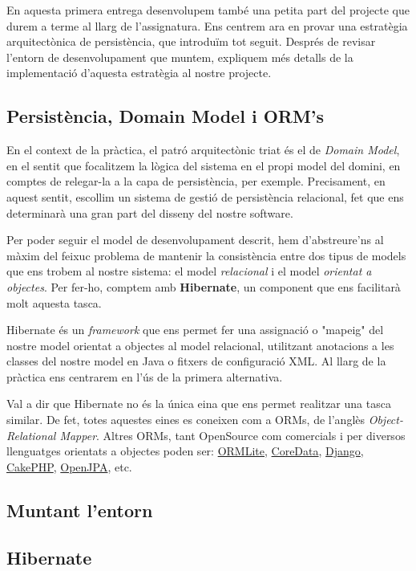 En aquesta primera entrega desenvolupem també una petita part del projecte que durem a terme al llarg de l'assignatura. Ens centrem ara en provar una estratègia arquitectònica de persistència, que introduïm tot seguit. Després de revisar l'entorn de desenvolupament que muntem, expliquem més detalls de la implementació d'aquesta estratègia al nostre projecte.

\subsection{Persistència, Domain Model i ORM's}
En el context de la pràctica, el patró arquitectònic triat és el de \emph{Domain Model}, en el sentit que focalitzem la lògica del sistema en el propi model del domini, en comptes de relegar-la a la capa de persistència, per exemple. Precisament, en aquest sentit, escollim un sistema de gestió de persistència relacional, fet que ens determinarà una gran part del disseny del nostre software.

Per poder seguir el model de desenvolupament descrit, hem d'abstreure'ns al màxim del feixuc problema de mantenir la consistència entre dos tipus de models que ens trobem al nostre sistema: el model \emph{relacional} i el model \emph{orientat a objectes}. Per fer-ho, comptem amb \textbf{Hibernate}, un component que ens facilitarà molt aquesta tasca.

Hibernate \cite{website:Hibernate} és un \emph{framework} que ens permet fer una assignació o "mapeig" del nostre model orientat a objectes al model relacional, utilitzant anotacions a les classes del nostre model en Java o fitxers de configuració XML. Al llarg de la pràctica ens centrarem en l'ús de la primera alternativa.

Val a dir que Hibernate no és la única eina que ens permet realitzar una tasca similar. De fet, totes aquestes eines es coneixen com a ORMs, de l'anglès \emph{Object-Relational Mapper}. Altres ORMs, tant OpenSource com comercials i per diversos llenguatges orientats a objectes poden ser: \hyperlink{http://ormlite.com/}{ORMLite}, \href{https://developer.apple.com/technologies/mac/data-management.html}{CoreData}, \href{https://www.djangoproject.com/}{Django}, \href{http://cakephp.org/}{CakePHP}, \href{http://openjpa.apache.org/}{OpenJPA}, etc.

\subsection{Muntant l'entorn}


\subsection{Hibernate}
